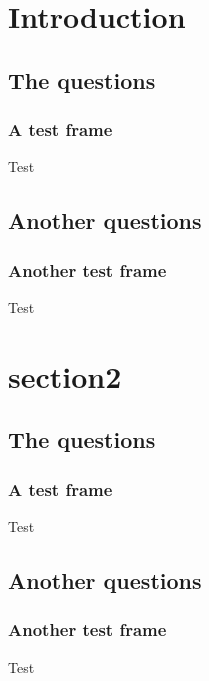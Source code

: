 \documentclass{beamer}
\begin{document}
\section{Introduction}
\subsection{The questions}
\begin{frame}\frametitle{A test frame}Test\end{frame}
\subsection{Another questions}
\begin{frame}\frametitle{Another test frame}Test
\end{frame}

\section{section2}
\subsection{The questions}
\begin{frame}\frametitle{A test frame}Test\end{frame}
\subsection{Another questions}
\begin{frame}\frametitle{Another test frame}Test
\end{frame}
\end{document}
